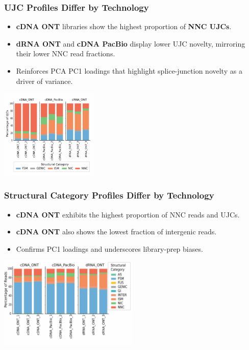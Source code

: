 \documentclass[aspectratio=169]{beamer}
\begin{document}
\begin{frame}
\begin{columns}[c]
  \end{columns}
\end{frame}

\begin{frame}
  \frametitle{UJC Profiles Differ by Technology}
  \begin{itemize}
    \item \textbf{cDNA ONT} libraries show the highest proportion of \textbf{NNC UJCs}.
    \item \textbf{dRNA ONT} and \textbf{cDNA PacBio} display lower UJC novelty, mirroring their lower NNC read fractions.
    \item Reinforces PCA PC1 loadings that highlight splice-junction novelty as a driver of variance.
  \end{itemize}
  \vspace{0.3cm}
  \centering
  \includegraphics[width=0.35\textwidth]{Genome Res_figure2_d.jpg}
\end{frame}

\begin{frame}
  \frametitle{Structural Category Profiles Differ by Technology}
  \begin{itemize}
    \item \textbf{cDNA ONT} exhibits the highest proportion of NNC reads and UJCs.
    \item \textbf{cDNA ONT} also shows the lowest fraction of intergenic reads.
    \item Confirms PC1 loadings and underscores library-prep biases.
  \end{itemize}
  \vspace{0.3cm}
  \centering
  \includegraphics[width=0.5\textwidth]{Genome Res_figure2_c.jpg}
\end{frame}
\end{document}
